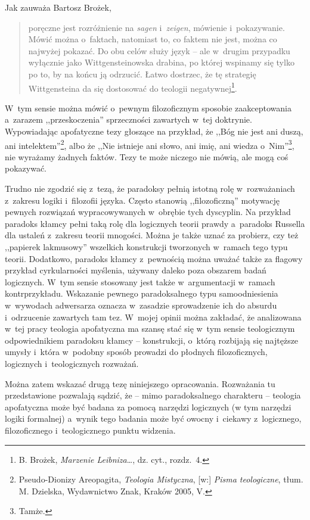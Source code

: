 Jak zauważa Bartosz Brożek,

\begin{quote}
poręczne jest rozróżnienie na \textit{sagen} i~\textit{zeigen}, mówienie i~pokazywanie. Mówić można o~faktach, natomiast to, co faktem nie jest, można co najwyżej pokazać. Do obu celów służy język -- ale w~drugim przypadku wyłącznie jako Wittgensteinowska drabina, po której wspinamy się tylko po to, by na końcu ją odrzucić. Łatwo dostrzec, że tę strategię Wittgensteina da się dostosować do teologii negatywnej\footnote{B. Brożek, \textit{Marzenie Leibniza}…, dz. cyt., rozdz.~4.}.
\end{quote}

W~tym sensie można mówić o~pewnym filozoficznym sposobie zaakceptowania a~zarazem ,,przeskoczenia'' sprzeczności zawartych w~tej doktrynie. Wypowiadając apofatyczne tezy głoszące na przykład, że ,,Bóg nie jest ani duszą, ani intelektem''\footnote{Pseudo-Dionizy Areopagita, \textit{Teologia Mistyczna}, [w:] \textit{Pisma teologiczne}, tłum. M. Dzielska, Wydawnictwo Znak, Kraków 2005, V.}, albo że ,,Nie istnieje ani słowo, ani imię, ani wiedza o~Nim''\footnote{Tamże.}, nie wyrażamy żadnych faktów. Tezy te może niczego nie mówią, ale mogą coś pokazywać.

Trudno nie zgodzić się z~tezą, że paradoksy pełnią istotną rolę w~rozważaniach z~zakresu logiki i~filozofii języka. Często stanowią ,,filozoficzną'' motywację pewnych rozwiązań wypracowywanych w~obrębie tych dyscyplin. Na przykład paradoks kłamcy pełni taką rolę dla logicznych teorii prawdy a~paradoks Russella dla ustaleń z~zakresu teorii mnogości. Można je także uznać za probierz, czy też ,,papierek lakmusowy'' wszelkich konstrukcji tworzonych w~ramach tego typu teorii. Dodatkowo, paradoks kłamcy z~pewnością można uważać także za flagowy przykład cyrkularności myślenia, używany daleko poza obszarem badań logicznych. W~tym sensie stosowany jest także w~argumentacji w~ramach kontrprzykładu. Wskazanie pewnego paradoksalnego typu samoodniesienia w~wywodach adwersarza oznacza w~zasadzie sprowadzenie ich do absurdu i~odrzucenie zawartych tam tez. W~mojej opinii można zakładać, że analizowana w~tej pracy teologia apofatyczna ma szansę stać się w~tym sensie teologicznym odpowiednikiem paradoksu kłamcy -- konstrukcji, o~którą rozbijają się najtęższe umysły i~która w~podobny sposób prowadzi do płodnych filozoficznych, logicznych i~teologicznych rozważań.

Można zatem wskazać drugą tezę niniejszego opracowania. Rozważania tu przedstawione pozwalają sądzić, że -- mimo paradoksalnego charakteru -- teologia apofatyczna może być badana za pomocą narzędzi logicznych (w tym narzędzi logiki formalnej) a~wynik tego badania może być owocny i~ciekawy z~logicznego, filozoficznego i~teologicznego punktu widzenia.

